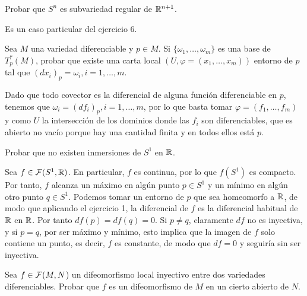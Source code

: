 \documentclass[twoside]{article}
\newcounter{ejercicio}
\begin{document}
\newpage

\begin{ejercicio}{8}
Probar que $S^n$ es subvariedad regular de $\mathbb{R}^{n+1}$.
\end{ejercicio}
\begin{solucion}
Es un caso particular del ejercicio 6.
\end{solucion}

\newpage

\begin{ejercicio}{9}
Sea $M$ una variedad diferenciable y $p\in M$. Si $\{\omega_1,\dots,\omega_m\}$ es una base de
$T^*_p (M)$, probar que existe una carta local $(U, \varphi = (x_1, \dots, x_m))$ entorno de
$p$ tal que $(dx_i)_p = \omega_i, i = 1, \dots,m$.
\end{ejercicio}
\begin{solucion}
Dado que todo covector es la diferencial de alguna función diferenciable en $p$, tenemos que $\omega_i=(df_i)_p, i=1,\dots, m$, por lo que basta tomar $\varphi=(f_1,\dots,f_m)$ y como $U$ la intersección de los dominios donde las $f_i$ son diferenciables, que es abierto no vacío porque hay una cantidad finita y en todos ellos está $p$.
\end{solucion}

\newpage

\begin{ejercicio}{10}
Probar que no existen inmersiones de $S^1$ en $\mathbb{R}$.
\end{ejercicio}
\begin{solucion}
Sea $f\in\mathcal{F}(S^1,\mathbb{R})$. En particular, $f$ es continua, por lo que $f(S^1)$ es compacto. Por tanto, $f$ alcanza un máximo en algún punto $p\in S^1$ y un mínimo en algún otro punto $q\in S^1$. Podemos tomar un entorno de $p$ que sea homeomorfo a $\mathbb{R}$, de modo que aplicando el ejercicio 1, la diferencial de $f$ es la diferencial habitual de $\mathbb{R}$ en $\mathbb{R}$. Por tanto $df(p)=df(q)=0$. Si $p\neq q$, claramente $df$ no es inyectiva, y si $p=q$, por ser máximo y mínimo, esto implica que la imagen de $f$ solo contiene un punto, es decir, $f$ es constante, de modo que $df=0$ y seguiría sin ser inyectiva.
\end{solucion}

\newpage

\begin{ejercicio}{11}
Sea $f \in \mathcal{F}(M,N$) un difeomorfismo local inyectivo entre dos variedades
diferenciables. Probar que $f$ es un difeomorfismo de $M$ en un cierto abierto
de $N$.
\end{ejercicio}
\begin{solucion}
\end{solucion}
\end{document}
